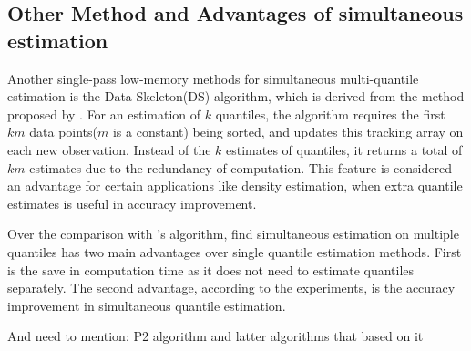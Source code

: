 \subsection{Other Method and Advantages of simultaneous estimation}

Another single-pass low-memory methods for simultaneous multi-quantile estimation is the Data Skeleton(DS)\cite{mcdermottDataSkeletonsSimultaneous2007} algorithm, which is derived from the method proposed by \citeauthor{liechtySinglepassLowstorageArbitrary} \cite{liechtySinglepassLowstorageArbitrary}. For an estimation of $k$ quantiles, the algorithm requires the first $km$ data points($m$ is a constant) being sorted, and updates this tracking array on each new observation. Instead of the $k$ estimates of quantiles, it returns a total of $km$ estimates due to the redundancy of computation. This feature is considered an advantage for certain applications like density estimation, when extra quantile estimates is useful in accuracy improvement.


Over the comparison with \citeauthor{liechtySinglepassLowstorageArbitrary}'s algorithm, \citeauthor{mcdermottDataSkeletonsSimultaneous2007}\cite{mcdermottDataSkeletonsSimultaneous2007} find simultaneous estimation on multiple quantiles has two main advantages over single quantile estimation methods. First is the save in computation time as it does not need to estimate quantiles separately. The second advantage, according to the experiments, is the accuracy improvement in simultaneous quantile estimation.  

 And need to mention: {P2 algorithm and latter algorithms that based on it}


